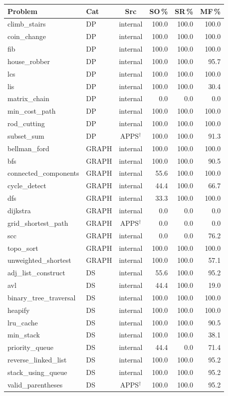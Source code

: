 \begin{tabular}{@{}llcrrr@{}}
\toprule
Problem & Cat & Src & SO\,\% & SR\,\% & MF\,\% \\
\midrule
climb\_stairs & DP & internal & 100.0 & 100.0 & 100.0 \\
coin\_change & DP & internal & 100.0 & 100.0 & 100.0 \\
fib & DP & internal & 100.0 & 100.0 & 100.0 \\
house\_robber & DP & internal & 100.0 & 100.0 & 95.7 \\
lcs & DP & internal & 100.0 & 100.0 & 100.0 \\
lis & DP & internal & 100.0 & 100.0 & 30.4 \\
matrix\_chain & DP & internal & 0.0 & 0.0 & 0.0 \\
min\_cost\_path & DP & internal & 100.0 & 100.0 & 100.0 \\
rod\_cutting & DP & internal & 100.0 & 100.0 & 100.0 \\
subset\_sum & DP & APPS$^\dagger$ & 100.0 & 100.0 & 91.3 \\
\midrule
bellman\_ford & GRAPH & internal & 100.0 & 100.0 & 100.0 \\
bfs & GRAPH & internal & 100.0 & 100.0 & 90.5 \\
connected\_components & GRAPH & internal & 55.6 & 100.0 & 100.0 \\
cycle\_detect & GRAPH & internal & 44.4 & 100.0 & 66.7 \\
dfs & GRAPH & internal & 33.3 & 100.0 & 100.0 \\
dijkstra & GRAPH & internal & 0.0 & 0.0 & 0.0 \\
grid\_shortest\_path & GRAPH & APPS$^\dagger$ & 0.0 & 0.0 & 0.0 \\
scc & GRAPH & internal & 0.0 & 0.0 & 76.2 \\
topo\_sort & GRAPH & internal & 100.0 & 100.0 & 100.0 \\
unweighted\_shortest & GRAPH & internal & 100.0 & 100.0 & 57.1 \\
\midrule
adj\_list\_construct & DS & internal & 55.6 & 100.0 & 95.2 \\
avl & DS & internal & 44.4 & 100.0 & 19.0 \\
binary\_tree\_traversal & DS & internal & 100.0 & 100.0 & 100.0 \\
heapify & DS & internal & 100.0 & 100.0 & 100.0 \\
lru\_cache & DS & internal & 100.0 & 100.0 & 90.5 \\
min\_stack & DS & internal & 100.0 & 100.0 & 38.1 \\
priority\_queue & DS & internal & 44.4 & 0.0 & 71.4 \\
reverse\_linked\_list & DS & internal & 100.0 & 100.0 & 95.2 \\
stack\_using\_queue & DS & internal & 100.0 & 100.0 & 95.2 \\
valid\_parentheses & DS & APPS$^\dagger$ & 100.0 & 100.0 & 95.2 \\
\bottomrule
\end{tabular}
